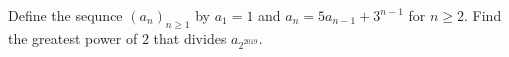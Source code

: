 Define the sequnce  ${(a_n)}_{n\ge1}$ by $a_1=1$ and $a_n=5a_{n-1}+3^{n-1}$ for $n\ge2$.
Find the greatest power of $2$ that divides $a_{2^{2019}}$.

